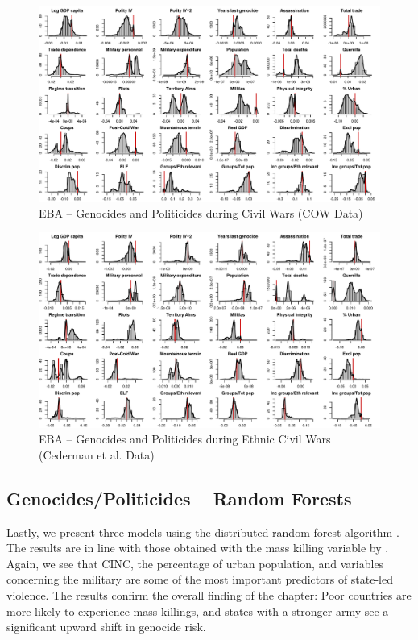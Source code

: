 \documentclass[a4paper,12pt]{article}
\begin{document}
\clearpage
\begin{figure}
    \centering
    \includegraphics[width=\textwidth]{images/uamk-cow.pdf}
    \caption{EBA -- Genocides and Politicides during Civil Wars (COW Data)}
    \label{fig:uamk-cow}
\end{figure}
\clearpage

\clearpage
\begin{figure}
    \centering
    \includegraphics[width=\textwidth]{images/uamk-eth.pdf}
    \caption{EBA -- Genocides and Politicides during Ethnic Civil Wars (Cederman et al. Data)}
    \label{fig:uamk-eth}
\end{figure}
\clearpage

\newpage
\subsection{Genocides/Politicides -- Random Forests}

Lastly, we present three models using the distributed random forest algorithm \citep{h2o2017}. The results are in line with those obtained with the mass killing variable by  \citet{ulfelder2008assessing}. Again, we see that CINC, the percentage of urban population, and variables concerning the military are some of the most important predictors of state-led violence. The results confirm the overall finding of the chapter: Poor countries are more likely to experience mass killings, and states with a stronger army see a significant upward shift in genocide risk.
\end{document}
